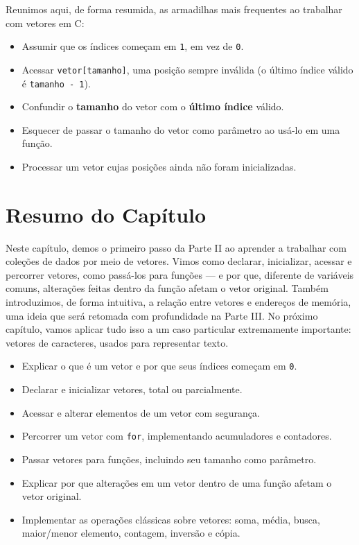 \documentclass[12pt,a4paper,oneside]{extreport}
\begin{document}
Reunimos aqui, de forma resumida, as armadilhas mais frequentes ao trabalhar com vetores em C:

\begin{itemize}
    \item Assumir que os índices começam em \texttt{1}, em vez de \texttt{0}.
    \item Acessar \texttt{vetor[tamanho]}, uma posição sempre inválida (o último índice válido é \texttt{tamanho - 1}).
    \item Confundir o \textbf{tamanho} do vetor com o \textbf{último índice} válido.
    \item Esquecer de passar o tamanho do vetor como parâmetro ao usá-lo em uma função.
    \item Processar um vetor cujas posições ainda não foram inicializadas.
\end{itemize}

\section*{Resumo do Capítulo}
Neste capítulo, demos o primeiro passo da Parte II ao aprender a trabalhar com coleções de dados por meio de vetores. Vimos como declarar, inicializar, acessar e percorrer vetores, como passá-los para funções — e por que, diferente de variáveis comuns, alterações feitas dentro da função afetam o vetor original. Também introduzimos, de forma intuitiva, a relação entre vetores e endereços de memória, uma ideia que será retomada com profundidade na Parte III. No próximo capítulo, vamos aplicar tudo isso a um caso particular extremamente importante: vetores de caracteres, usados para representar texto.

\begin{objetivos}
\begin{itemize}
    \item Explicar o que é um vetor e por que seus índices começam em \texttt{0}.
    \item Declarar e inicializar vetores, total ou parcialmente.
    \item Acessar e alterar elementos de um vetor com segurança.
    \item Percorrer um vetor com \texttt{for}, implementando acumuladores e contadores.
    \item Passar vetores para funções, incluindo seu tamanho como parâmetro.
    \item Explicar por que alterações em um vetor dentro de uma função afetam o vetor original.
    \item Implementar as operações clássicas sobre vetores: soma, média, busca, maior/menor elemento, contagem, inversão e cópia.
\end{itemize}
\end{objetivos}
\end{document}

